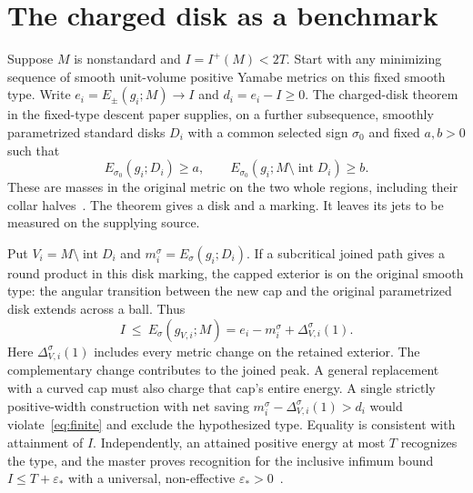 \documentclass[11pt,letterpaper]{article}
\numberwithin{equation}{section}
\begin{document}
\section{The charged disk as a benchmark}\label{sec:benchmark}

Suppose \(M\) is nonstandard and \(I=I^+(M)<2T\). Start with any
minimizing sequence of smooth unit-volume positive Yamabe metrics
on this fixed smooth type. Write \(e_i=E_\pm(g_i;M)\to I\) and
\(d_i=e_i-I\ge0\). The charged-disk theorem in the fixed-type descent paper
supplies, on a further subsequence, smoothly parametrized standard
disks \(D_i\) with a common selected sign \(\sigma_0\) and fixed
\(a,b>0\) such that
\[
 E_{\sigma_0}(g_i;D_i)\ge a,\qquad
 E_{\sigma_0}(g_i;M\setminus\operatorname{int}D_i)\ge b .
\]
These are masses in the original metric on the two whole regions,
including their collar halves~\cite{Baker2026FixedDescent}.
The theorem gives a disk and a marking. It leaves its jets to be
measured on the supplying source.

Put \(V_i=M\setminus\operatorname{int}D_i\) and
\(m_i^\sigma=E_\sigma(g_i;D_i)\). If a subcritical joined path gives
a round product in this disk marking, the capped exterior is on the
original smooth type: the angular transition between the new cap
and the original parametrized disk extends across a ball. Thus
\begin{equation}\label{eq:finite}
 I\ \le\ E_\sigma(\widehat g_{V,i};M)
     = e_i-m_i^\sigma+\Delta_{V,i}^\sigma(1).
\end{equation}
Here \(\Delta_{V,i}^\sigma(1)\) includes every metric change on the
retained exterior. The complementary change contributes to the
joined peak. A general replacement with a curved cap must also
charge that cap's entire energy. A single strictly positive-width
construction with net saving \(m_i^\sigma-\Delta_{V,i}^\sigma(1)>d_i\)
would violate~\eqref{eq:finite} and exclude the hypothesized type.
Equality is consistent with attainment of \(I\). Independently, an
attained positive energy at most \(T\) recognizes the type, and the
master proves recognition for the inclusive infimum bound
\(I\le T+\varepsilon_*\) with a universal, non-effective
\(\varepsilon_*>0\)~\cite{Baker2026ChiralMaster}.
\end{document}
